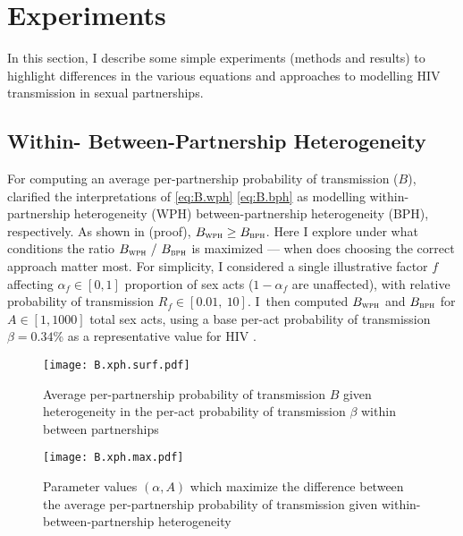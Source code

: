 \section{Experiments}\label{foi.exp}
In this section, I describe some simple experiments (methods and results) to
highlight differences in the various equations and approaches
to modelling HIV transmission in sexual partnerships.
\subsection{Within- \vs Between-Partnership Heterogeneity}\label{foi.exp.xph}
For computing an average per-partnership probability of transmission ($B$),
 clarified the interpretations of
\eqref{eq:B.wph} \vs \eqref{eq:B.bph} as modelling
within-partnership heterogeneity (WPH) \vs between-partnership heterogeneity (BPH), respectively.
As shown in  (proof), $B_{\textsc{wph}} \ge B_{\textsc{bph}}$.
Here I explore under what conditions the ratio $B_{\textsc{wph}}~/~B_{\textsc{bph}}$ is maximized
--- \ie when does choosing the correct approach matter most.
For simplicity, I considered a single illustrative factor $f$
affecting $\alpha_f \in [0,1]$ proportion of sex acts ($1-\alpha_f$ are unaffected),
with relative probability of transmission $R_f \in [0.01,~10]$.
I~then computed $B_{\textsc{wph}}$ and $B_{\textsc{bph}}$ for $A \in [1,1000]$ total sex acts,
using a base per-act probability of transmission $\beta = 0.34$\%
as a representative value for HIV \cite{Boily2009}.
\par
\begin{figure}
  \centering\texttt{[image: B.xph.surf.pdf]}
  \caption{Average per-partnership probability of transmission $B$
    given heterogeneity in the per-act probability of transmission $\beta$
    within \vs between partnerships}
  \label{fig:B.xph.surf}
\end{figure}
\begin{figure}
  \centering\texttt{[image: B.xph.max.pdf]}
  \caption{Parameter values $(\alpha,A)$ which maximize the difference between
    the average per-partnership probability of transmission
    given within- \vs between-partnership heterogeneity}
  \label{fig:B.xph.max}
\end{figure}

